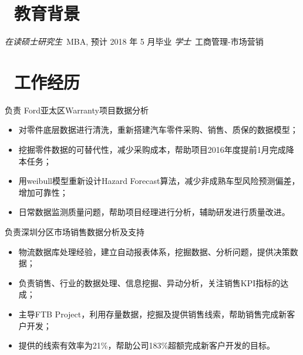 \documentclass{resume}
\begin{document}


 
\section{\faGraduationCap\  教育背景}
\textit{在读硕士研究生}\ MBA, 预计 2018 年 5 月毕业
\textit{学士}\ 工商管理-市场营销

\section{\faTrain\ 工作经历}
负责 Ford亚太区Warranty项目数据分析
\begin{itemize}
  \item 对零件底层数据进行清洗，重新搭建汽车零件采购、销售、质保的数据模型；
  \item 挖掘零件数据的可替代性，减少采购成本，帮助项目2016年度提前1月完成降本任务；
  \item 用weibull模型重新设计Hazard Forecast算法，减少非成熟车型风险预测偏差，增加可靠性；
  \item 日常数据监测质量问题，帮助项目经理进行分析，辅助研发进行质量改进。
\end{itemize}

负责深圳分区市场销售数据分析及支持
\begin{itemize}
  \item 物流数据库处理经验，建立自动报表体系，挖掘数据、分析问题，提供决策数据； 
  \item 负责销售、行业的数据处理、信息挖掘、异动分析，关注销售KPI指标的达成；
  \item 主导FTB Project，利用存量数据，挖掘及提供销售线索，帮助销售完成新客户开发；
   \item 提供的线索有效率为21\%，帮助公司183\%超额完成新客户开发的目标。
\end{itemize}
\end{document}
